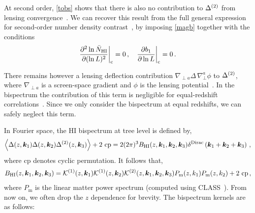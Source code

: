 \begin{itemize}
At second order, \eqref{tobs} shows that there is also no contribution to $\Delta^{{(2)}}$ from lensing convergence~\cite{DiDio:2015bua,Jalivand:2018vfz}. We can recover this result from the full general expression for second-order number density contrast~\cite{Bertacca:2014dra, Bertacca:2014wga, Yoo:2014sfa, DiDio:2014lka, Bertacca:2014hwa}, by imposing \eqref{magb} together with the conditions~\cite{DiDio:2015bua}
\begin{equation} \label{magb2}
\frac{\partial^2 \ln \bar{N}_{{\mathrm{HI}}}}{\partial (\ln L)^2}\bigg|_\mathrm{c} = 0\,, \quad  \frac{\partial b_1}{\partial \ln L}\bigg|_\mathrm{c}=0\,.
\end{equation}

There remains however a lensing deflection contribution $\nabla_{\perp a}\Delta\,\nabla_\perp^a\phi$ to  $\Delta^{{(2)}}$,  where $\nabla_{\perp a}$ is a screen-space gradient and $\phi$ is the lensing potential~\cite{Umeh:2015gza,DiDio:2015bua,Jalivand:2018vfz}. In the bispectrum the contribution of this term is negligible for equal-redshift correlations~\cite{DiDio:2015bua,Durrer:2020orn}. Since we only consider the bispectrum at equal redshifts, we can safely neglect this term. 
\end{itemize}
\vspace{0.2cm}
%
In Fourier space, the HI bispectrum at tree level is defined by,
\begin{equation}
\left\langle \Delta(z,\bm {k}_1)\Delta(z,\bm {k}_2)\Delta^{(2)}(z,\bm {k}_3) \right\rangle + \text{2 cp}=2 (2\pi)^3 B_{{\mathrm{HI}}}(z, \bm {k}_1, \bm {k}_2, \bm {k}_3) \delta^\mathrm{Dirac}\left(\bm {k}_1 + \bm {k}_2 + \bm {k}_3\right)\,, \label{e1.3}
\end{equation}
where cp denotes cyclic permutation. It follows that, 
\begin{equation}
B_{{\mathrm{HI}}}(z, \bm {k}_1,\bm {k}_2,\bm {k}_3) = \mathcal{K}^{(1)}(z, \bm {k}_1)\mathcal{K}^{(1)}(z, \bm {k}_2)\mathcal{K}^{(2)}(z, \bm {k}_1,\bm {k}_2,\bm {k}_3)P_\mathrm{m} (z, k_{1})P_\mathrm{m}(z, k_{2}) + \text{2 cp}\,, \label{e1.5}
\end{equation} 
where $P_\mathrm{m}$ is the linear matter power spectrum (computed using CLASS~\cite{Blas:2011rf}).  From now on, we often drop the $z$ dependence for brevity.  
The bispectrum kernels are as follows:
